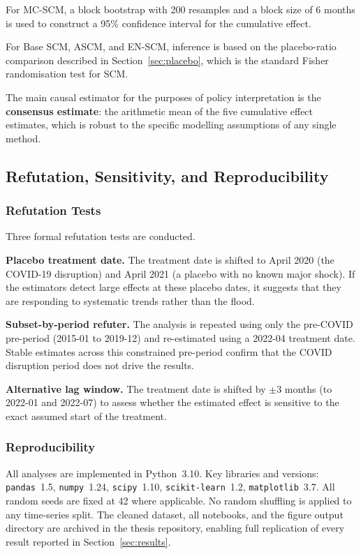 For MC-SCM, a block bootstrap with 200 resamples and a block size
of 6 months is used to construct a 95\% confidence interval for
the cumulative effect.

For Base SCM, ASCM, and EN-SCM, inference is based on the
placebo-ratio comparison described in Section~\ref{sec:placebo},
which is the standard Fisher randomisation test for SCM.

The main causal estimator for the purposes of policy interpretation
is the \textbf{consensus estimate}: the arithmetic mean of the five
cumulative effect estimates, which is robust to the specific
modelling assumptions of any single method.

\subsection{Refutation, Sensitivity, and Reproducibility}
\label{sec:refutation}

\subsubsection{Refutation Tests}
\label{sec:refutation_tests}

Three formal refutation tests are conducted.

\textbf{Placebo treatment date.}
The treatment date is shifted to April 2020 (the COVID-19
disruption) and April 2021 (a placebo with no known major shock).
If the estimators detect large effects at these placebo dates, it
suggests that they are responding to systematic trends rather than
the flood.

\textbf{Subset-by-period refuter.}
The analysis is repeated using only the pre-COVID pre-period
(2015-01 to 2019-12) and re-estimated using a 2022-04 treatment
date.
Stable estimates across this constrained pre-period confirm that the
COVID disruption period does not drive the results.

\textbf{Alternative lag window.}
The treatment date is shifted by $\pm$3 months (to 2022-01 and
2022-07) to assess whether the estimated effect is sensitive to the
exact assumed start of the treatment.

\subsubsection{Reproducibility}
\label{sec:repro}

All analyses are implemented in Python~3.10.
Key libraries and versions: \texttt{pandas}~1.5, \texttt{numpy}~1.24,
\texttt{scipy}~1.10, \texttt{scikit-learn}~1.2,
\texttt{matplotlib}~3.7.
All random seeds are fixed at 42 where applicable.
No random shuffling is applied to any time-series split.
The cleaned dataset, all notebooks, and the figure output directory
are archived in the thesis repository, enabling full replication of
every result reported in Section~\ref{sec:results}.
